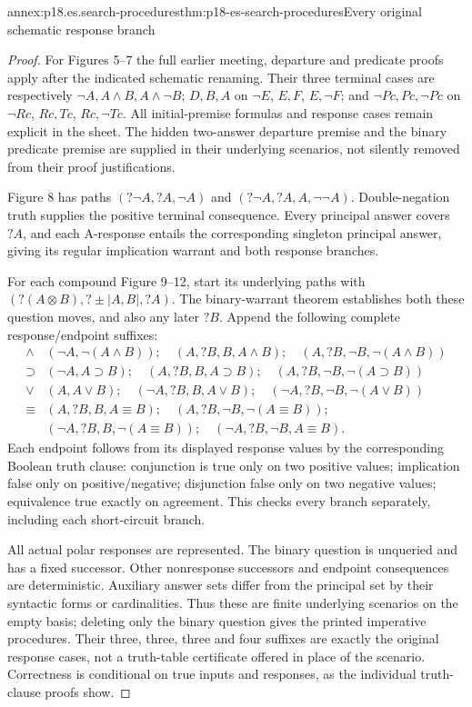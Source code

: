 \begin{annexitem}{annex:p18.es.search-procedures}{thm:p18-es-search-procedures}{Every original schematic response branch}
\begin{proof}
For Figures 5--7 the full earlier meeting, departure and predicate proofs
apply after the indicated schematic renaming. Their three terminal cases
are respectively \(\neg A,A\land B,A\land\neg B\);
\(D,B,A\) on \(\neg E\), \(E,F\), \(E,\neg F\);
and \(\neg Pc,Pc,\neg Pc\) on \(\neg Rc\), \(Rc,Tc\),
\(Rc,\neg Tc\). All initial-premise formulas and response cases remain
explicit in the sheet. The hidden two-answer departure premise and the
binary predicate premise are supplied in their underlying scenarios, not
silently removed from their proof justifications.

Figure 8 has paths \((?\neg A,?A,\neg A)\) and
\((?\neg A,?A,A,\neg\neg A)\). Double-negation truth supplies the
positive terminal consequence. Every principal answer covers \(?A\), and
each A-response entails the corresponding singleton principal answer,
giving its regular implication warrant and both response branches.

For each compound Figure 9--12, start its underlying paths with
\((?(A\otimes B),?\pm|A,B|,?A)\). The binary-warrant theorem
establishes both these question moves, and also any later \(?B\).
Append the following complete response/endpoint suffixes:
\[
\begin{array}{c|l}
 \land& (\neg A,\neg(A\land B));\quad
 (A,?B,B,A\land B);\quad(A,?B,\neg B,\neg(A\land B))\\
 \supset& (\neg A,A\supset B);\quad
 (A,?B,B,A\supset B);\quad(A,?B,\neg B,\neg(A\supset B))\\
 \lor& (A,A\lor B);\quad
 (\neg A,?B,B,A\lor B);\quad(\neg A,?B,\neg B,\neg(A\lor B))\\
 \equiv& (A,?B,B,A\equiv B);\quad
 (A,?B,\neg B,\neg(A\equiv B));\\
 & (\neg A,?B,B,\neg(A\equiv B));\quad
 (\neg A,?B,\neg B,A\equiv B).
\end{array}
\]
Each endpoint follows from its displayed response values by the corresponding
Boolean truth clause: conjunction is true only on two positive values;
implication false only on positive/negative; disjunction false only on two
negative values; equivalence true exactly on agreement. This checks every
branch separately, including each short-circuit branch.

All actual polar responses are represented. The binary question is unqueried
and has a fixed successor. Other nonresponse successors and endpoint consequences
are deterministic. Auxiliary answer sets differ from the principal set by
their syntactic forms or cardinalities. Thus these are finite underlying
scenarios on the empty basis; deleting only the binary question gives the
printed imperative procedures. Their three, three, three and four suffixes
are exactly the original response cases, not a truth-table certificate offered
in place of the scenario. Correctness is conditional on true inputs and
responses, as the individual truth-clause proofs show.
\end{proof}
\end{annexitem}
